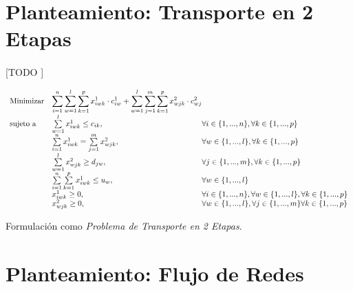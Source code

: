 \documentclass{article}
\begin{document}
  \section{Planteamiento: Transporte en 2 Etapas}

    \paragraph{}
    [TODO ]

    \begin{eqfloat}
      \begin{equation}
        \begin{array}{ll@{}ll}
          \text{Minimizar}	& \displaystyle \sum\limits_{i=1}^{n}\sum\limits_{w=1}^{l}\sum\limits_{k=1}^{p} x^{1}_{iwk} \cdot c^{1}_{iw} +
              \sum\limits_{w=1}^{l}\sum\limits_{j=1}^{m}\sum\limits_{k=1}^{p} x^{2}_{wjk} \cdot c^{2}_{wj} \\
          \text{sujeto a}		& \sum\limits_{w=1}^{l} x^{1}_{iwk}	\leq c_{ik}, 		                        & \forall i \in \{1,...,n\}, \forall k \in \{1,...,p\}\\
                            &	\sum\limits_{i=1}^{n} x^{1}_{iwk}	= \sum\limits_{j=1}^{m} x^{2}_{wjk}, 		& \forall w \in \{1,...,l\}, \forall k \in \{1,...,p\}\\
                            &	\sum\limits_{w=1}^{l} x^{2}_{wjk}	\geq d_{jw}, 		                        & \forall j \in \{1,...,m\}, \forall k \in \{1,...,p\}\\
                            &	\sum\limits_{i=1}^{n}\sum\limits_{k=1}^{p}  x^{1}_{iwk}	\leq u_{w}, 		  & \forall w \in \{1,...,l\}\\
                            & x^{1}_{iwk}	\geq 0, 	& \forall i \in \{1,...,n\}, \forall w \in \{1,...,l\}, \forall k \in \{1,...,p\} \\
                            & x^{2}_{wjk}	\geq 0, 	& \forall w \in \{1,...,l\}, \forall j \in \{1,...,m\}\forall k \in \{1,...,p\}
        \end{array}
      \end{equation}
      \caption{Formulación como \emph{Problema de Transporte en 2 Etapas}.}
      \label{eq:linear-programming-model}
    \end{eqfloat}



  \section{Planteamiento: Flujo de Redes}
\end{document}
